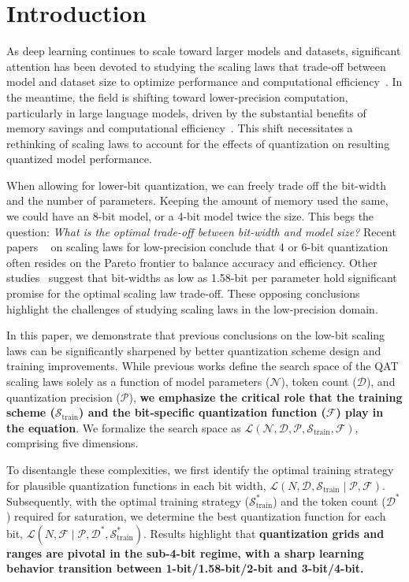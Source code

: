 \section{Introduction}
As deep learning continues to scale toward larger models and datasets, significant attention has been devoted to studying the scaling laws that trade-off between model and dataset size to optimize performance and computational efficiency~\cite{hoffmann2022training,kumar2024scaling,dettmers2023case}. 
In the meantime, the field is shifting toward lower-precision computation, particularly in large language models, driven by the substantial benefits of memory savings and computational efficiency~\cite{liu2023binary,ma2024era}.
This shift necessitates a rethinking of scaling laws to account for the effects of quantization on resulting quantized model performance.



When allowing for lower-bit quantization, we can freely trade off the bit-width and the number of parameters. Keeping the amount of memory used the same, we could have an 8-bit model, or a 4-bit model twice the size. This begs the question: \textit{What is the optimal trade-off between bit-width and model size?}
Recent papers ~\cite{dettmers2023case, kumar2024scaling} on scaling laws for low-precision conclude that 4 or 6-bit quantization often resides on the Pareto frontier to balance accuracy and efficiency. 
Other studies~\cite{ma2024era, spectra} suggest that bit-widths as low as 1.58-bit per parameter hold significant promise for the optimal scaling law trade-off. 
These opposing conclusions highlight the challenges of studying scaling laws in the low-precision domain. 


In this paper, we demonstrate that previous conclusions on the low-bit scaling laws can be significantly sharpened by better quantization scheme design and training improvements.
While previous works define the search space of the QAT scaling laws solely as a function of model parameters ($\mathcal{N}$), token count ($\mathcal{D}$), and quantization precision ($\mathcal{P}$), \textbf{we emphasize the critical role that the training scheme ($\mathcal{S}_{\text{train}}$) and the bit-specific quantization function ($\mathcal{F}$) play in the equation}. We formalize the search space as $\mathcal{L}(\mathcal{N}, \mathcal{D}, \mathcal{P}, \mathcal{S}_{\text{train}}, \mathcal{F})$, comprising five dimensions. 

To disentangle these complexities, we first identify the optimal training strategy for plausible quantization functions in each bit width, $\mathcal{L}(N, \mathcal{D}, \mathcal{S}_{\text{train}} \mid \mathcal{P}, \mathcal{F})$. Subsequently, with the optimal training strategy ($\mathcal{S}_{\text{train}}^*$) and the token count ($\mathcal{D}^*$) required for saturation, we determine the best quantization function for each bit, $\mathcal{L}(N, \mathcal{F} \mid \mathcal{P}, \mathcal{D}^*, \mathcal{S}_{\text{train}}^*)$. Results highlight that \textbf{quantization grids and ranges are pivotal in the sub-4-bit regime, with a sharp learning behavior transition between 1-bit/1.58-bit/2-bit and 3-bit/4-bit.} 

